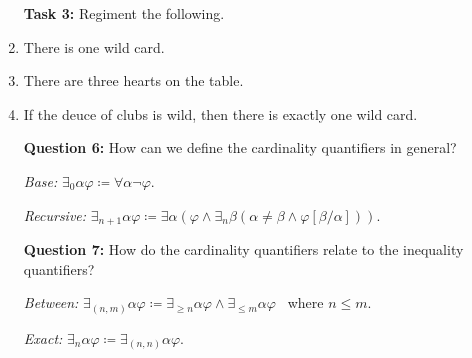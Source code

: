 \documentclass[a4paper, 11pt]{article} %
\newcommand{\qt}[2]{#1 #2} %
\newcommand{\unisub}[2]{[#1/#2]}
\begin{document}
\begin{enumerate}
  \item[\bf Task 3:] Regiment the following.
  \item There is one wild card.
  \item There are three hearts on the table.
  \item If the deuce of clubs is wild, then there is exactly one wild card.
  \item[\bf Question 6:] How can we define the cardinality quantifiers in general?
  \item[\it Base:] $\qt{\exists_0}{\alpha}\varphi \coloneq \qt{\forall}{\alpha}\neg\varphi$.
  \item[\it Recursive:] $\qt{\exists_{n+1}}{\alpha}\varphi \coloneq \qt{\exists}{\alpha}(\varphi \wedge \qt{\exists_n}{\beta}(\alpha \neq \beta \wedge \varphi\unisub{\beta}{\alpha}))$.
  \item[\bf Question 7:] How do the cardinality quantifiers relate to the inequality quantifiers?
  \item[\it Between:] $\qt{\exists_{(n,m)}}{\alpha}\varphi \coloneq \qt{\exists_{\geq n}}{\alpha}\varphi \wedge \qt{\exists_{\leq m}}{\alpha}\varphi$~ where $n\leq m$.
  \item[\it Exact:] $\qt{\exists_{n}}{\alpha}\varphi \coloneq \qt{\exists_{(n,n)}}{\alpha}\varphi.$
\end{enumerate}






\end{document}

